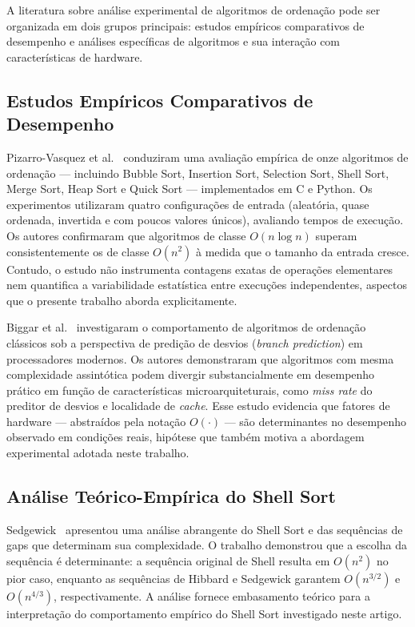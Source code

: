 \documentclass[12pt]{article}
\begin{document}
A literatura sobre análise experimental de algoritmos de
ordenação pode ser organizada em dois grupos principais:
estudos empíricos comparativos de desempenho e análises
específicas de algoritmos e sua interação com características
de hardware.

\subsection*{Estudos Empíricos Comparativos de Desempenho}

Pizarro-Vasquez et al.~\cite{pizarro2020} conduziram uma
avaliação empírica de onze algoritmos de ordenação —
incluindo Bubble Sort, Insertion Sort, Selection Sort,
Shell Sort, Merge Sort, Heap Sort e Quick Sort —
implementados em C e Python. Os experimentos utilizaram
quatro configurações de entrada (aleatória, quase ordenada,
invertida e com poucos valores únicos), avaliando tempos
de execução. Os autores confirmaram que algoritmos de classe
$O(n \log n)$ superam consistentemente os de classe $O(n^2)$
à medida que o tamanho da entrada cresce. Contudo, o estudo
não instrumenta contagens exatas de operações elementares
nem quantifica a variabilidade estatística entre execuções
independentes, aspectos que o presente trabalho aborda
explicitamente.

Biggar et al.~\cite{biggar2008} investigaram o comportamento
de algoritmos de ordenação clássicos sob a perspectiva de
predição de desvios (\textit{branch prediction}) em
processadores modernos. Os autores demonstraram que algoritmos
com mesma complexidade assintótica podem divergir
substancialmente em desempenho prático em função de
características microarquiteturais, como \textit{miss rate}
do preditor de desvios e localidade de \textit{cache}. Esse
estudo evidencia que fatores de hardware — abstraídos pela
notação $O(\cdot)$ — são determinantes no desempenho
observado em condições reais, hipótese que também motiva a
abordagem experimental adotada neste trabalho.

\subsection*{Análise Teórico-Empírica do Shell Sort}

Sedgewick~\cite{sedgewick1996} apresentou uma análise
abrangente do Shell Sort e das sequências de gaps que
determinam sua complexidade. O trabalho demonstrou que a
escolha da sequência é determinante: a sequência original
de Shell resulta em $O(n^2)$ no pior caso, enquanto as
sequências de Hibbard e Sedgewick garantem $O(n^{3/2})$
e $O(n^{4/3})$, respectivamente. A análise fornece
embasamento teórico para a interpretação do comportamento
empírico do Shell Sort investigado neste artigo.
\end{document}
